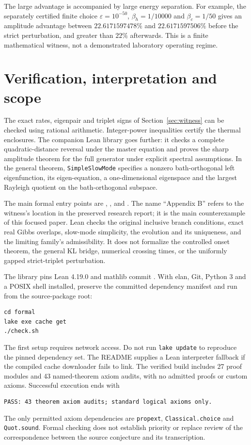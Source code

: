 \documentclass[11pt]{article}
\begin{document}
The large advantage is accompanied by large energy separation. For
example, the separately certified finite choice $\varepsilon=10^{-50}$,
$\beta_h=1/10000$ and $\beta_c=1/50$ gives an amplitude advantage
between $22.6171597478\%$ and $22.6171597506\%$ before the strict
perturbation, and greater than $22\%$ afterwards. This is a finite
mathematical witness, not a demonstrated laboratory operating regime.

\section{Verification, interpretation and scope}\label{sec:verification}
The exact rates, eigenpair and triplet signs of Section~\ref{sec:witness}
can be checked using rational arithmetic. Integer-power inequalities
certify the thermal enclosures. The companion Lean library goes further:
it checks a complete quadratic-distance reversal under the master
equation and proves the sharp amplitude theorem for the full generator
under explicit spectral assumptions. In the general theorem,
\texttt{SimpleSlowMode} specifies a nonzero bath-orthogonal left
eigenfunction, its eigen-equation, a one-dimensional eigenspace and the
largest Rayleigh quotient on the bath-orthogonal subspace.

The main formal entry points are
,
, and
. The name ``Appendix B''
refers to the witness's location in the preserved research report; it is
the main counterexample of this focused paper. Lean checks the original
inclusive branch conditions, exact real Gibbs overlaps, slow-mode
simplicity, the evolution and its uniqueness, and the limiting family's
admissibility. It does not formalize the controlled onset theorem,
the general KL bridge, numerical crossing times, or the uniformly gapped
strict-triplet perturbation.

The library pins Lean 4.19.0 and mathlib commit
. With elan, Git,
Python 3 and a POSIX shell installed, preserve the committed dependency
manifest and run from the source-package root:
\begin{verbatim}
cd formal
lake exe cache get
./check.sh
\end{verbatim}
The first setup requires network access. Do not run \texttt{lake update}
to reproduce the pinned dependency set. The README supplies a Lean
interpreter fallback if the compiled cache downloader fails to link.
The verified build includes 27 proof modules and 43 named-theorem axiom
audits, with no admitted proofs or custom axioms. Successful execution
ends with
\begin{verbatim}
PASS: 43 theorem axiom audits; standard logical axioms only.
\end{verbatim}
The only permitted axiom dependencies are \texttt{propext},
\texttt{Classical.choice} and \texttt{Quot.sound}. Formal checking does
not establish priority or replace review of the correspondence between
the source conjecture and its transcription.
\end{document}
